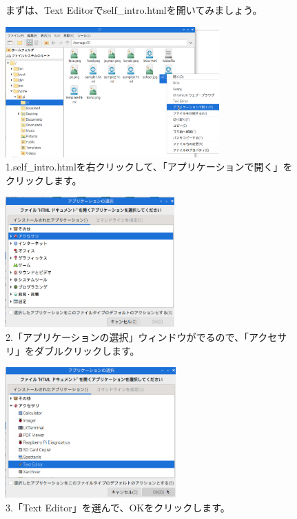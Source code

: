 \documentclass[a4paper,12pt]{jarticle}
\begin{document}
\begin{figure}[ht]
  \begin{minipage}{\textwidth}
    \flushleft
    まずは、Text
    Editorでself\_intro.htmlを開いてみましょう。
    \begin{minipage}{0.45\linewidth}
      \includegraphics[width=\linewidth,height=5cm]{textbook-img1040.png}\\
      1.self\_intro.htmlを右クリックして、「アプリケーションで開く」をクリックします。
    \end{minipage}
    \hfill
    \vspace{20pt}
    \begin{minipage}{0.45\linewidth}
      \includegraphics[width=\linewidth,height=5cm]{textbook-img1041.png}\\
      2.「アプリケーションの選択」ウィンドウがでるので、「アクセサリ」をダブルクリックします。
    \end{minipage}
    \begin{minipage}{0.45\linewidth}
      \includegraphics[width=\linewidth,height=5cm]{textbook-img1042.png}\\
      3.「Text Editor」を選んで、OKをクリックします。
    \end{minipage}
  \end{minipage}


\end{figure}
\end{document}
